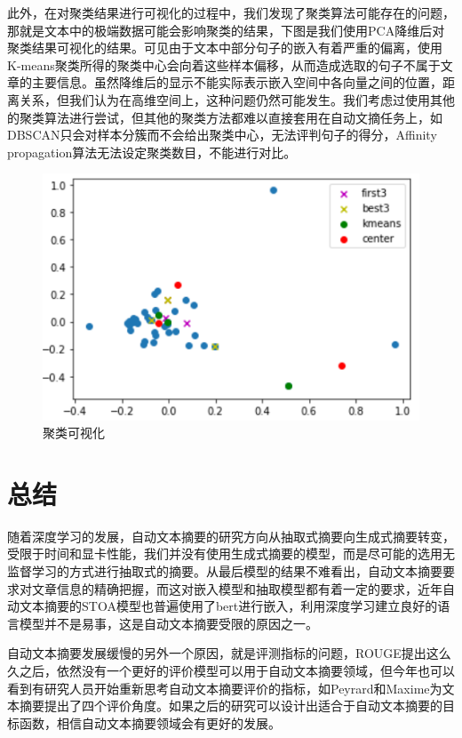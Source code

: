 \documentclass[10pt,twocolumn,letterpaper]{article}
\begin{document}
	此外，在对聚类结果进行可视化的过程中，我们发现了聚类算法可能存在的问题，那就是文本中的极端数据可能会影响聚类的结果，下图是我们使用PCA降维后对聚类结果可视化的结果。可见由于文本中部分句子的嵌入有着严重的偏离，使用K-means聚类所得的聚类中心会向着这些样本偏移，从而造成选取的句子不属于文章的主要信息。虽然降维后的显示不能实际表示嵌入空间中各向量之间的位置，距离关系，但我们认为在高维空间上，这种问题仍然可能发生。我们考虑过使用其他的聚类算法进行尝试，但其他的聚类方法都难以直接套用在自动文摘任务上，如DBSCAN只会对样本分簇而不会给出聚类中心，无法评判句子的得分，Affinity propagation算法无法设定聚类数目，不能进行对比。
	\begin{figure}[h]
		\centering
		\includegraphics[width=\linewidth]{figures/1.png}
		\caption{聚类可视化}
	\end{figure}


	\section{总结}
	随着深度学习的发展，自动文本摘要的研究方向从抽取式摘要向生成式摘要转变，受限于时间和显卡性能，我们并没有使用生成式摘要的模型，而是尽可能的选用无监督学习的方式进行抽取式的摘要。从最后模型的结果不难看出，自动文本摘要要求对文章信息的精确把握，而这对嵌入模型和抽取模型都有着一定的要求，近年自动文本摘要的STOA模型也普遍使用了bert进行嵌入，利用深度学习建立良好的语言模型并不是易事，这是自动文本摘要受限的原因之一。
	
	自动文本摘要发展缓慢的另外一个原因，就是评测指标的问题，ROUGE提出这么久之后，依然没有一个更好的评价模型可以用于自动文本摘要领域，但今年也可以看到有研究人员开始重新思考自动文本摘要评价的指标，如Peyrard和Maxime为文本摘要提出了四个评价角度\cite{peyrard2019simple}。如果之后的研究可以设计出适合于自动文本摘要的目标函数，相信自动文本摘要领域会有更好的发展。
	

	
	{\small
		
		
	}
	
	
\end{document}
